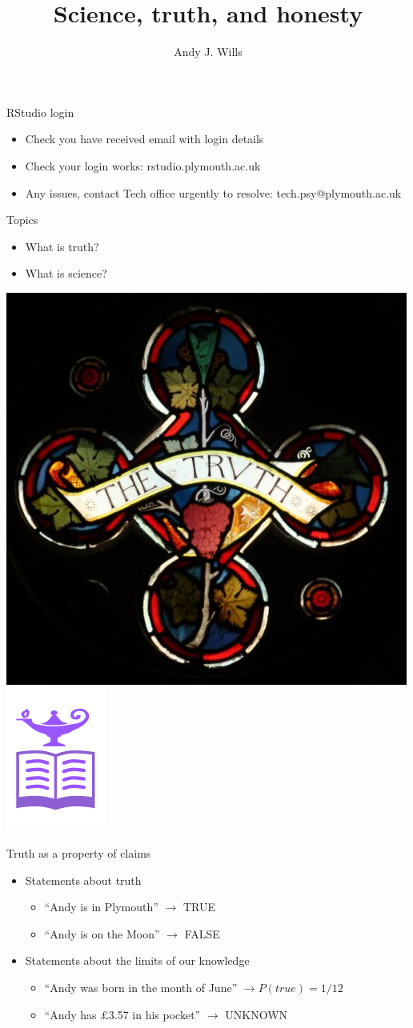\documentclass{beamer}
\title[Critical Thinking]{Science, truth, and honesty }
\author{Andy J. Wills}
\date{}
\begin{document}
\frame{\titlepage}

\begin{frame}{RStudio login}
  \begin{itemize}
    \item Check you have received email with login details
    \item Check your login works: rstudio.plymouth.ac.uk
    \item Any issues, contact Tech office urgently to resolve: tech.psy@plymouth.ac.uk
  \end{itemize}
\end{frame}

\begin{frame}{Topics}
	\begin{itemize}
		\item What is truth? 
		\item What is science?  
	\end{itemize}
	\centerline{
	\includegraphics[width=.3\textwidth]{pics/truth.jpg}
	\includegraphics[width=.3\textwidth]{pics/science.png}
	}
\end{frame}

\begin{frame}{Truth as a property of claims}
	\begin{itemize}
		\item Statements about truth
		\begin{itemize}
			\item ``Andy is in Plymouth'' $\to$ TRUE 
			\item ``Andy is on the Moon'' $\to$ FALSE 
		\end{itemize}
		\item Statements about the limits of our knowledge
		\begin{itemize}
			\item ``Andy was born in the month of June'' $\to P(true) = 1/12$ 
			\item ``Andy has \pounds 3.57 in his pocket'' $\to$ UNKNOWN
		\end{itemize}  
	\end{itemize}
\end{frame}
\end{document}
